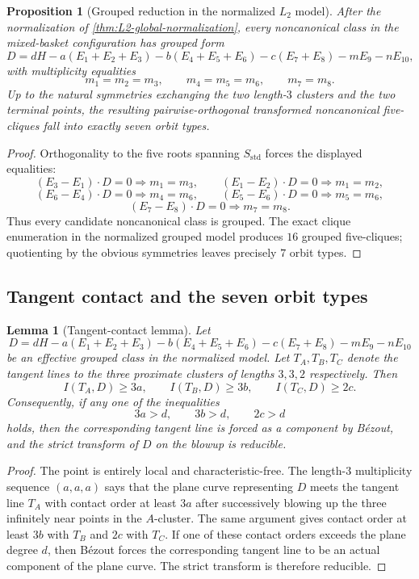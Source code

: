 \documentclass[11pt]{article}
\newtheorem{proposition}[proposition]{Proposition}
\newtheorem{lemma}[lemma]{Lemma}
\theoremstyle{definition}
\begin{document}
\begin{proposition}[Grouped reduction in the normalized $L_2$ model]\label{prop:grouped-reduction}
After the normalization of \cref{thm:L2-global-normalization}, every noncanonical class in the mixed-basket configuration has grouped form
\[
D=dH-a(E_1+E_2+E_3)-b(E_4+E_5+E_6)-c(E_7+E_8)-mE_9-nE_{10},
\]
with multiplicity equalities
\[
m_1=m_2=m_3,\qquad m_4=m_5=m_6,\qquad m_7=m_8.
\]
Up to the natural symmetries exchanging the two length-$3$ clusters and the two terminal points, the resulting pairwise-orthogonal transformed noncanonical five-cliques fall into exactly seven orbit types.
\end{proposition}

\begin{proof}
Orthogonality to the five roots spanning $S_{\mathrm{std}}$ forces the displayed equalities:
\[
(E_3-E_1)\cdot D=0\Rightarrow m_1=m_3,
\qquad
(E_1-E_2)\cdot D=0\Rightarrow m_1=m_2,
\]
\[
(E_6-E_4)\cdot D=0\Rightarrow m_4=m_6,
\qquad
(E_5-E_6)\cdot D=0\Rightarrow m_5=m_6,
\]
\[
(E_7-E_8)\cdot D=0\Rightarrow m_7=m_8.
\]
Thus every candidate noncanonical class is grouped. The exact clique enumeration in the normalized grouped model produces $16$ grouped five-cliques; quotienting by the obvious symmetries leaves precisely $7$ orbit types.
\end{proof}

\subsection{Tangent contact and the seven orbit types}

\begin{lemma}[Tangent-contact lemma]\label{lem:tangent-contact}
Let
\[
D=dH-a(E_1+E_2+E_3)-b(E_4+E_5+E_6)-c(E_7+E_8)-mE_9-nE_{10}
\]
be an effective grouped class in the normalized model. Let $T_A,T_B,T_C$ denote the tangent lines to the three proximate clusters of lengths $3,3,2$ respectively. Then
\[
I(T_A,D)\ge 3a,
\qquad
I(T_B,D)\ge 3b,
\qquad
I(T_C,D)\ge 2c.
\]
Consequently, if any one of the inequalities
\[
3a>d,
\qquad
3b>d,
\qquad
2c>d
\]
holds, then the corresponding tangent line is forced as a component by B\'ezout, and the strict transform of $D$ on the blowup is reducible.
\end{lemma}

\begin{proof}
The point is entirely local and characteristic-free. The length-$3$ multiplicity sequence $(a,a,a)$ says that the plane curve representing $D$ meets the tangent line $T_A$ with contact order at least $3a$ after successively blowing up the three infinitely near points in the $A$-cluster. The same argument gives contact order at least $3b$ with $T_B$ and $2c$ with $T_C$. If one of these contact orders exceeds the plane degree $d$, then B\'ezout forces the corresponding tangent line to be an actual component of the plane curve. The strict transform is therefore reducible.\qedhere
\end{proof}
\end{document}
